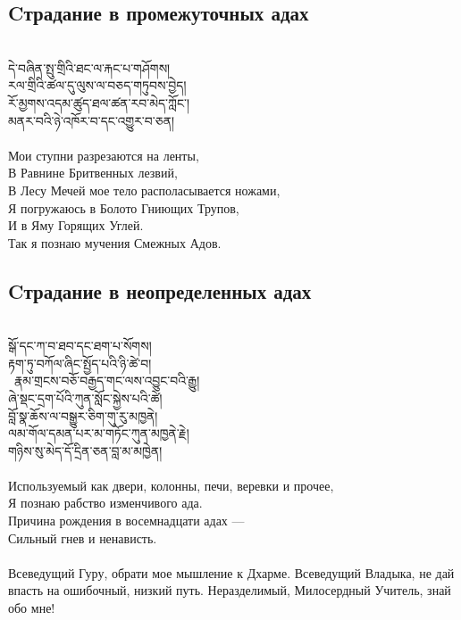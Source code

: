 \newpage
\subsection*{Cтрадание в промежуточных адах}
\\
\ti
དེ་བཞིན་སྤུ་གྲིའི་ཐང་ལ་རྐང་པ་གཤོགས།\\
རལ་གྲིའི་ཚལ་དུ་ལུས་ལ་བཅད་གཏུབས་བྱེད།\\
རོ་མྱགས་འདམ་ཚུད་ཐལ་ཚན་རབ་མེད་ཀློང་། \\
མནར་བའི་ཉེ་འཁོར་བ་དང་འགྱུར་བ་ཅན།\\
\\
\ru
Мои ступни разрезаются на ленты,\\
В Равнине Бритвенных лезвий,\\
В Лесу Мечей мое тело располасывается ножами,\\
Я погружаюсь в Болото Гниющих Трупов,\\
И в Яму Горящих Углей.\\
Так я познаю мучения Смежных Адов.

\subsection*{Cтрадание в неопределенных адах}
\\
\ti
སྒོ་དང་ཀ་བ་ཐབ་དང་ཐག་པ་སོགས།\\
རྟག་ཏུ་བཀོལ་ཞིང་སྤྱོད་པའི་ཉི་ཚེ་བ། \\\
རྣམ་གྲངས་བཅོ་བརྒྱད་གང་ལས་འབྱུང་བའི་རྒྱུ། \\
ཞེ་སྡང་དྲག་པོའི་ཀུན་སློང་སྐྱེས་པའི་ཚེ། \\
བློ་སྣ་ཆོས་ལ་བསྒྱུར་ཅིག་གུ་རུ་མཁྱནེ། \\
ལམ་གོལ་དམན་པར་མ་གཏོང་ཀུན་མཁྱནེ་རྗེ། \\
གཉིས་སུ་མེད་དོ་དྲིན་ཅན་བླ་མ་མཁྱེན།\\
\\
\ru
Используемый как двери, колонны, печи, веревки и прочее,\\
Я познаю рабство изменчивого ада.\\
Причина рождения в восем\-надцати адах —\\
Сильный гнев и ненависть.\\
\\
Всеведущий Гуру, обрати мое мышление к Дхарме.
Всеведущий Владыка, не дай впасть на ошибочный, низкий путь.
Нераздели\-мый, Милосердный Учитель, знай обо мне!

\newpage

